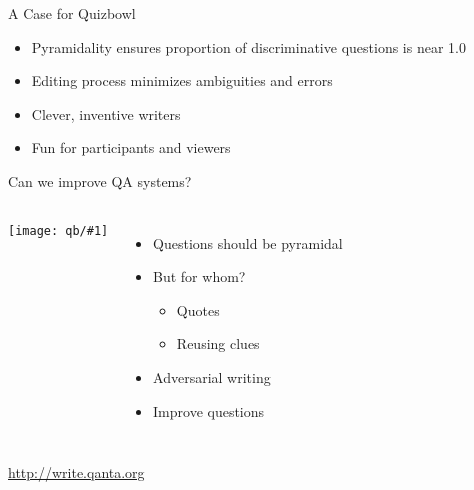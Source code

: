 \documentclass[xcolor=dvipsnames,xcolor=table]{beamer}
\newcommand{\fsi}[2]{
\begin{frame}[plain]
\vspace*{-1pt}
\makebox[\linewidth]{\texttt{[image: \#1]}}
\begin{center}
#2
\end{center}
\end{frame}
}
\newcommand{\gfxq}[2]{
\begin{center}
	\texttt{[image: qb/\#1]}
\end{center}
}
\begin{document}
\begin{frame}{A Case for Quizbowl}

  \begin{itemize}
    \item Pyramidality ensures proportion of discriminative questions is near 1.0
    \item Editing process minimizes ambiguities and errors
    \item Clever, inventive writers
    \item Fun for participants and viewers
  \end{itemize}
\end{frame}


\fsi{qb/jennings_handshake}{}

\begin{frame}{Can we improve QA systems?}

\begin{columns}
     \gfxq{trick/pyramid}{.9}
     \begin{itemize}
       \item Questions should be pyramidal
       \item But for whom?
         \begin{itemize}
           \item Quotes
           \item Reusing clues
         \end{itemize}
         \item Adversarial writing
         \item Improve questions
     \end{itemize}
\end{columns}
\end{frame}





\fsi{qb/trick/brahms_0}{\href{http://write.qanta.org}{http://write.qanta.org}}
\fsi{qb/trick/brahms_1}{}
\fsi{qb/trick/brahms_2}{}
\fsi{qb/trick/brahms_3}{}
\fsi{qb/trick/brahms_4}{}
\fsi{qb/trick/brahms_5}{}
\end{document}
